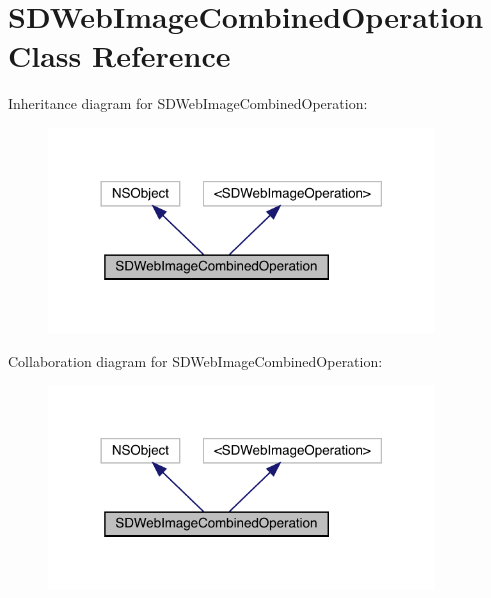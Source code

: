 \hypertarget{interface_s_d_web_image_combined_operation}{}\section{S\+D\+Web\+Image\+Combined\+Operation Class Reference}
\label{interface_s_d_web_image_combined_operation}


Inheritance diagram for S\+D\+Web\+Image\+Combined\+Operation\+:\nopagebreak
\begin{figure}[H]
\begin{center}
\leavevmode
\includegraphics[width=290pt]{interface_s_d_web_image_combined_operation__inherit__graph}
\end{center}
\end{figure}


Collaboration diagram for S\+D\+Web\+Image\+Combined\+Operation\+:\nopagebreak
\begin{figure}[H]
\begin{center}
\leavevmode
\includegraphics[width=290pt]{interface_s_d_web_image_combined_operation__coll__graph}
\end{center}
\end{figure}
